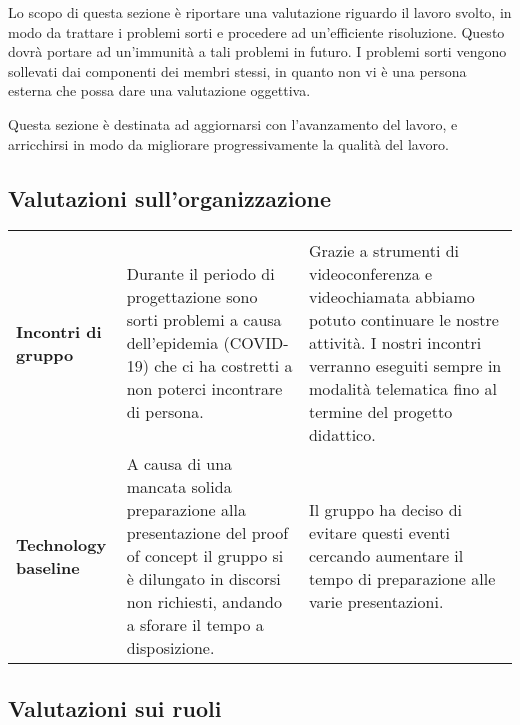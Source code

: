 \documentclass[../piano-di-qualifica.tex]{subfiles}
\begin{document}
  Lo scopo di questa sezione è riportare una valutazione riguardo il lavoro svolto, in modo da trattare
  i problemi sorti e procedere ad un'efficiente risoluzione.
  Questo dovrà portare ad un'immunità a tali problemi in futuro.
  I problemi sorti vengono sollevati dai componenti dei membri stessi, in quanto non vi è una
  persona esterna che possa dare una valutazione oggettiva.

  Questa sezione è destinata ad aggiornarsi con l'avanzamento del lavoro, e arricchirsi in modo
  da migliorare progressivamente la qualità del lavoro.

  \subsection{Valutazioni sull'organizzazione}

  \begin{longtable}[H]{>{\centering\bfseries}m{4cm} >{\centering\arraybackslash}m{6cm} >{\centering\arraybackslash}m{6cm}}
    \rowcolor{darkgray!90!}
    \color{white}{\textbf{Dominio}} & \color{white}{\textbf{Problema}} & \color{white}{\textbf{Soluzione}} \\
    Incontri di gruppo & Durante il periodo di progettazione sono sorti problemi a causa dell'epidemia (COVID-19) che ci ha costretti a non poterci incontrare di persona.  & Grazie a strumenti di videoconferenza e videochiamata abbiamo potuto continuare le nostre attività. I nostri incontri verranno eseguiti sempre in modalità telematica fino al termine del progetto didattico.\\
    Technology baseline & A causa di una mancata solida preparazione alla presentazione del proof of concept il gruppo si è dilungato in discorsi non richiesti, andando a sforare il tempo a disposizione. & Il gruppo ha deciso di evitare questi eventi cercando aumentare il tempo di preparazione alle varie presentazioni. \\
  \end{longtable}


\newpage
  \subsection{Valutazioni sui ruoli}
\end{document}
